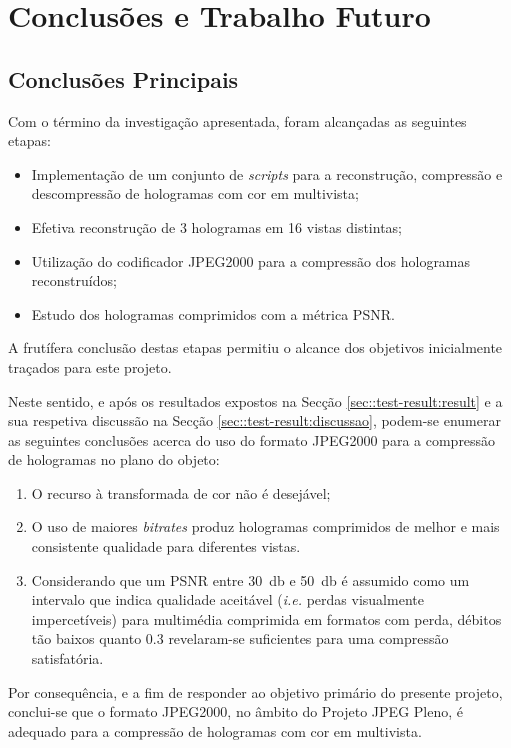 \chapter{Conclusões e Trabalho Futuro}
\label{ch::conclusao}

\section{Conclusões Principais}
\label{sec::conclusao:principal}

Com o término da investigação apresentada, foram alcançadas as seguintes etapas:
\begin{itemize}
    \item Implementação de um conjunto de \textit{scripts} para a reconstrução, compressão e descompressão de hologramas com cor em multivista;
    \item Efetiva reconstrução de 3 hologramas em 16 vistas distintas;
    \item Utilização do codificador JPEG2000 para a compressão dos hologramas reconstruídos;
    \item Estudo dos hologramas comprimidos com a métrica \ac{PSNR}.
\end{itemize}

A frutífera conclusão destas etapas permitiu o alcance dos objetivos inicialmente traçados para este projeto.

Neste sentido, e após os resultados expostos na Secção \ref{sec::test-result:result} e a sua respetiva discussão na Secção \ref{sec::test-result:discussao}, podem-se enumerar as seguintes conclusões acerca do uso do formato JPEG2000 para a compressão de hologramas no plano do objeto:

\begin{enumerate}
    \item O recurso à transformada de cor não é desejável;
    \item O uso de maiores \textit{bitrates} produz hologramas comprimidos de melhor e mais consistente qualidade para diferentes vistas.
    \item Considerando que um \ac{PSNR} entre \SI{30}{\decibel} e \SI{50}{\decibel} é assumido como um intervalo que indica qualidade aceitável (\textit{i.e.} perdas visualmente impercetíveis) para multimédia comprimida em formatos com perda, débitos tão baixos quanto \SI{0.3}{} revelaram-se suficientes para uma compressão satisfatória.
\end{enumerate}

Por consequência, e a fim de responder ao objetivo primário do presente projeto, conclui-se que o formato JPEG2000, no âmbito do Projeto JPEG Pleno, é adequado para a compressão de hologramas com cor em multivista.

